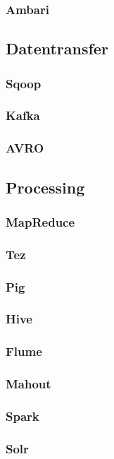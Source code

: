 \subsubsection*{Ambari}

\subsection{Datentransfer}
\subsubsection*{Sqoop}
\subsubsection*{Kafka}
\subsubsection*{AVRO}

\subsection{Processing}
\subsubsection*{MapReduce}
\subsubsection*{Tez}
\subsubsection*{Pig}
\subsubsection*{Hive}
\subsubsection*{Flume}
\subsubsection*{Mahout}
\subsubsection*{Spark}
\subsubsection*{Solr}
